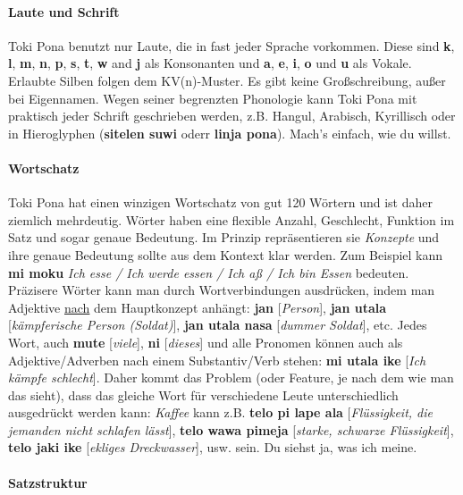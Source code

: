 \documentclass[10pt,a4paper]{article}
\begin{document}
\begin{multicols}{2}
\paragraph{Laute und Schrift}

Toki Pona benutzt nur Laute, die in fast jeder Sprache vorkommen. Diese sind  \textbf{k}, \textbf{l}, \textbf{m}, \textbf{n}, \textbf{p}, \textbf{s}, \textbf{t}, \textbf{w} and \textbf{j} als Konsonanten und \textbf{a}, \textbf{e}, \textbf{i}, \textbf{o} und \textbf{u} als Vokale. Erlaubte Silben folgen dem KV(n)-Muster. Es gibt keine Großschreibung, außer bei Eigennamen. Wegen seiner begrenzten Phonologie kann Toki Pona mit praktisch jeder Schrift geschrieben werden, z.B. Hangul, Arabisch, Kyrillisch oder in Hieroglyphen (\textbf{sitelen suwi} oderr \textbf{linja pona}). Mach's einfach, wie du willst.

\paragraph{Wortschatz}

Toki Pona hat einen winzigen Wortschatz von gut 120 Wörtern und ist daher ziemlich mehrdeutig. Wörter haben eine flexible Anzahl, Geschlecht, Funktion im Satz und sogar genaue Bedeutung. Im Prinzip repräsentieren sie \textit{Konzepte} und ihre genaue Bedeutung sollte aus dem Kontext klar werden. Zum Beispiel kann \textbf{mi moku} \textit{Ich esse / Ich werde essen / Ich aß / Ich bin Essen} bedeuten. Präzisere Wörter kann man durch Wortverbindungen ausdrücken, indem man Adjektive \underline{nach} dem Hauptkonzept anhängt: \textbf{jan} [\textit{Person}], \textbf{jan utala} [\textit{kämpferische Person (Soldat)}], \textbf{jan utala nasa} [\textit{dummer Soldat}], etc. Jedes Wort, auch \textbf{mute} [\textit{viele}], \textbf{ni} [\textit{dieses}] und alle Pronomen können auch als Adjektive/Adverben nach einem Substantiv/Verb stehen: \textbf{mi utala ike} [\textit{Ich kämpfe schlecht}]. Daher kommt das Problem (oder Feature, je nach dem wie man das sieht), dass das gleiche Wort für verschiedene Leute unterschiedlich ausgedrückt werden kann: \textit{Kaffee} kann z.B. \textbf{telo pi lape ala} [\textit{Flüssigkeit, die jemanden nicht schlafen lässt}], \textbf{telo wawa pimeja} [\textit{starke, schwarze Flüssigkeit}], \textbf{telo jaki ike} [\textit{ekliges Dreckwasser}], usw. sein. Du siehst ja, was ich meine.

\paragraph{Satzstruktur}


\end{multicols}
\end{document}
